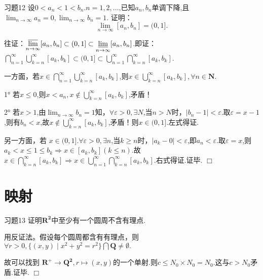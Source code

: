 \documentclass[11pt, a4paper, twoside]{ctexbook}
\newenvironment{proof2}{{\noindent\heiti 证明}}{\hfill $\Box $\par}
\begin{document}
	\begin{myproposition}{习题12}{}
		设$0<a_{n}<1<b_{n}.n=1,2,…$,已知${a_{n}},{b_{n}}$单调下降,且$\displaystyle\lim_{n \to \infty}a_{n}=0,\displaystyle\lim_{n \to \infty}b_{n}=1$.
		证明：$$\lim_{n\to \infty}[a_{n},b_{n}]=(0,1].$$
	\end{myproposition}
    \begin{proof2}
		往证：$\displaystyle\varlimsup_{n\to \infty}[a_{n},b_{n}]\subset(0,1]\subset\displaystyle\varliminf_{n\to \infty}[a_{n},b_{n}]$.即证：$\displaystyle\bigcap_{n=1}^{\infty}\bigcup_{k=n}^{\infty}[a_{k},b_{k}]\subset(0,1]\subset \displaystyle\bigcup_{n=1}^{\infty}\bigcap_{k=n}^{\infty}[a_{k},b_{k}]$.
		
		
		一方面，若$x\in \displaystyle\bigcap_{n=1}^{\infty}\bigcup_{k=n}^{\infty}[a_{k},b_{k}]$,则$x\in \displaystyle\bigcup_{k=n}^{\infty}[a_{k},b_{k}],\forall n \in \mathbf{N}$.
		
		
		1° 若$x\leq 0$,则$x < a_{n},x\notin \displaystyle\bigcup_{k=n}^{\infty}[a_{k},b_{k}]$,矛盾！
		
		
		2° 若$x>1$,由$\displaystyle\lim_{n \to \infty}b_{n}=1$知，$\forall \varepsilon >0,\exists N$,当$n>N$时，$\mid b_{n}-1\mid<\varepsilon$.取$\varepsilon=x-1$,则有$b_{n}<x$,故$x\notin \displaystyle\bigcup_{k=n}^{\infty}[a_{k},b_{k}]$,矛盾！则$x\in(0,1]$.左式得证.
		
		
		另一方面，若 $x\in(0,1]$.$\forall \varepsilon>0,\exists n$,当$k\geq n$时，$\mid a_{k}-0\mid<\varepsilon$,即$a_{n}<\varepsilon$.取$\varepsilon=x$,则$a_{k}<x\leq 1 \leq b_{k} \Rightarrow x \in [a_{k},b_{k}](k\leq n)$.故$x \in \displaystyle\bigcap_{k=n}^{\infty}[a_{k},b_{k}] \Rightarrow x \in \displaystyle\bigcup_{n=1}^{\infty}\bigcap_{k=n}^{\infty}[a_{k},b_{k}]$.右式得证.证毕.
	\end{proof2}


    \section{映射}

	\begin{myproposition}{习题13}{}
	    证明$\mathbf{R^2}$中至少有一个圆周不含有理点.
    \end{myproposition}
	\begin{proof2}
		用反证法。假设每个圆周都含有有理点，则$\forall r>0,\{(x,y)\mid x^2+y^2=r^2\}\bigcap \mathbf{Q}\neq \emptyset.$

        
		故可以找到 $\mathbf{R^{+}} \to \mathbf{Q^2},r \mapsto  (x,y)$的一个单射.则$c \leq {N}_{0}\times {N_{0}}={N_{0}}$.这与$c>N_{0}$矛盾.证毕. 
    \end{proof2}
\end{document}
